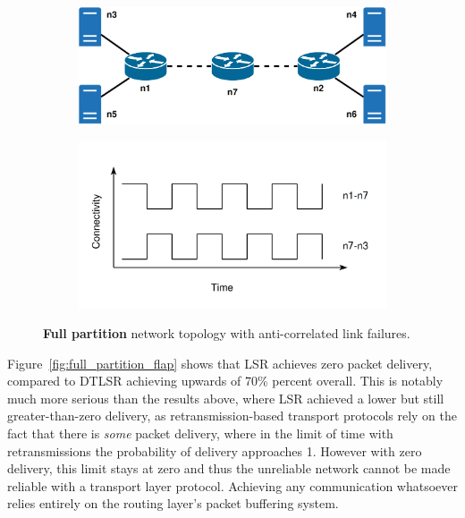 \documentclass[withindex,glossary,openany]{cam-thesis}
\begin{document}
\begin{figure}[H]
\centering
\begin{subfigure}{.65\textwidth}
  \centering
  \includegraphics[width=1\linewidth]{delay_full_partition_topology}
  \caption{}
  \label{fig:full_partition_topology}
\end{subfigure}

\begin{subfigure}{.65\textwidth}
  \centering
  \includegraphics[width=1\linewidth]{delay_full_partition_graph}
  \caption{}
  \label{fig:full_partition_graph}
\end{subfigure}
\caption{\textbf{Full partition} network topology with anti-correlated link failures.}
\label{fig:full_partition}
\end{figure}

Figure~\ref{fig:full_partition_flap} shows that LSR achieves zero packet delivery, compared to DTLSR achieving upwards of 70\% percent overall. This is notably much more serious than the results above, where LSR achieved a lower but still greater-than-zero delivery, as retransmission-based transport protocols rely on the fact that there is \textit{some} packet delivery, where in the limit of time with retransmissions the probability of delivery approaches 1. However with zero delivery, this limit stays at zero and thus the unreliable network cannot be made reliable with a transport layer protocol. Achieving any communication whatsoever relies entirely on the routing layer's packet buffering system.
\end{document}
